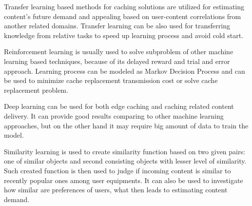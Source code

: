\documentclass[conference]{IEEEtran}
\begin{document}
Transfer learning based methods for caching solutions are utilized for estimating content's future demand and appealing based on user-content correlations from another related domains\cite{cache1}. Transfer learning can be also used for transferring knowledge from relative tasks to speed up learning process and avoid cold start\cite{cache3}.\par
Reinforcement learning is usually used to solve subproblem of other machine learning based techniques, because of its delayed reward and trial and error approach. Learning process can be modeled as Markov Decision Process and can be used to minimize cache replacement transmission cost or solve cache replacement problem\cite{cache3}.\par
Deep learning can be used for both edge caching and caching related content delivery. It can provide good results comparing to other machine learning approaches, but on the other hand it may require big amount of data to train the model\cite{cache1}.\par
Similarity learning is used to create similarity function based on two given pairs: one of similar objects and second consisting objects with lesser level of similarity. Such created function is then used to judge if incoming content is similar to recently popular ones among user equipments\cite{cache1}. It can also be used to investigate how similar are preferences of users, what then leads to estimating content demand.\par\newpage
\end{document}
